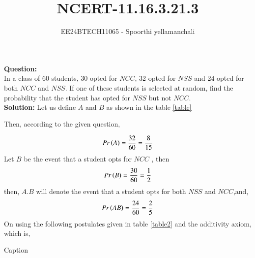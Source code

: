 \documentclass[journal]{IEEEtran}
\begin{document}

\vspace{3cm}

\title{NCERT-11.16.3.21.3}
\author{EE24BTECH11065 - Spoorthi yellamanchali
}
{\let\newpage\relax\maketitle}

\renewcommand{\thefigure}{\theenumi}
\renewcommand{\thetable}{\theenumi}
\setlength{\intextsep}{10pt} %


\renewcommand{\thetable}{\theenumi}


\textbf{Question:}
\\
In a class of 60 students, 30 opted for $NCC$, 32 opted for $NSS$ and 24 opted for both $NCC$ and $NSS$. If one of these students is selected at random, find the probability that the student has opted for $NSS$ but not $NCC$.
\\
\textbf{Solution: }
Let us define $A$ and $B$ as shown in the table \ref{table}
\\
\begin{table}[h!]
    \centering
    

   \label{table}
\end{table}


Then, according to the given question,

\begin{align}
    Pr\left(A\right) = \frac{32}{60} = \frac{8}{15}
\end{align}
Let $B$ be the event that a student opts for $NCC$ , then 
\begin{align}
    Pr\left(B\right) = \frac{30}{60} = \frac{1}{2}
\end{align}
then, $A.B$ will denote the event that a student opts for both $NSS$ and $NCC$,and,
\begin{align}
    Pr\left(AB\right) = \frac{24}{60} = \frac{2}{5}
\end{align}
On using the following postulates given in table \ref{table2} and the additivity axiom, which is,
\begin{table}[h!]
    \centering
    
    \caption{Caption}
    \label{table2}
\end{table}
\end{document}
